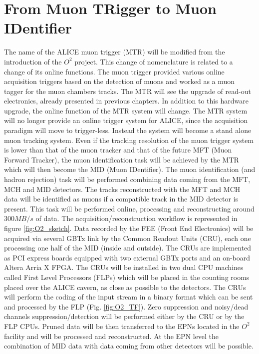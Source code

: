 \section{From Muon TRigger to Muon IDentifier}
The name of the ALICE muon trigger (MTR) will be modified from the introduction of the $O^2$ project.
This change of nomenclature is related to a change of its online functions.
The muon trigger provided various online acquisition triggers based on the detection of muons and worked as a muon tagger for the muon chambers tracks.
The MTR will see the upgrade of read-out electronics, already presented in previous chapters.
In addition to this hardware upgrade, the online function of the MTR system will change.
The MTR system will no longer provide an online trigger system for ALICE, since the acquisition paradigm will move to trigger-less.
Instead the system will become a stand alone muon tracking system.
Even if the tracking resolution of the muon trigger system is lower than that of the muon tracker and that of the future MFT (Muon Forward Tracker), the muon identification task will be achieved by the MTR which will then become the MID (Muon IDentifier).
The muon identification (and hadron rejection) task will be performed combining data coming from the MFT, MCH and MID detectors.
The tracks reconstructed with the MFT and MCH data will be identified as muons if a compatible track in the MID detector is present.
This task will be performed online, processing and reconstructing around $300 MB/s$ of data.
The acquisition/reconstruction workflow is represented in figure \ref{fig:O2_sketch}.
Data recorded by the FEE (Front End Electronics) will be acquired via several GBTx link by the Common Readout Units (CRU), each one processing one half of the MID (inside and outside).
The CRUs are implemented as PCI express boards equipped with two external GBTx ports and an on-board Altera Arria X FPGA.
The CRUs will be installed in two dual CPU machines called First Level Processors (FLPs) which will be placed in the counting rooms placed over the ALICE cavern, as close as possible to the detectors.
The CRUs will perform the coding of the input stream in a binary format which can be sent and processed by the FLP (Fig. \ref{fig:O2_TF}).
Zero suppression and noisy/dead channels suppression/detection will be performed either by the CRU or by the FLP CPUs.
Pruned data will be then transferred to the EPNs located in the $O^2$ facility and will be processed and reconstructed.
At the EPN level the combination of MID data with data coming from other detectors will be possible.

